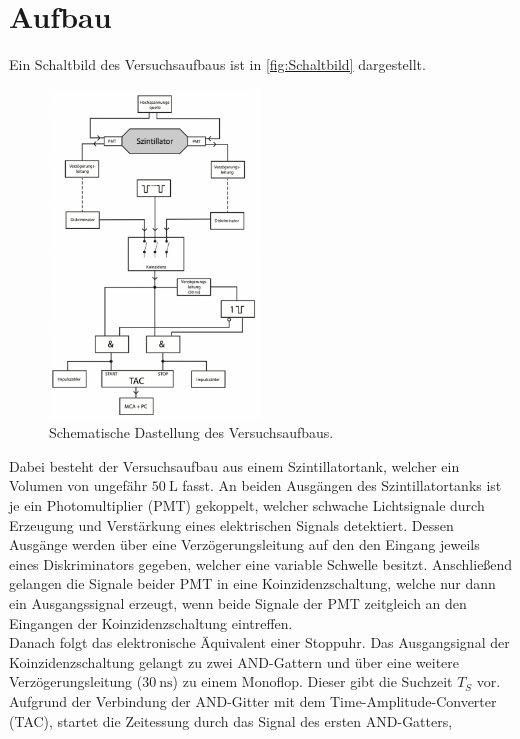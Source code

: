 \section{Aufbau}
\label{sec:Aufbau}
Ein Schaltbild des Versuchsaufbaus ist in \autoref{fig:Schaltbild} dargestellt. 
\begin{figure}[H]
    \centering
    \includegraphics[width=0.5\textwidth]{Abbildungen/Schaltung.png}
    \caption {Schematische Dastellung des Versuchsaufbaus.\cite{V01}}
    \label{fig:Schaltbild}
\end{figure}
Dabei besteht der Versuchsaufbau aus einem Szintillatortank, welcher ein Volumen von ungefähr $\qty{50}{\liter}$ fasst.
An beiden Ausgängen des Szintillatortanks ist je ein Photomultiplier (PMT) gekoppelt, welcher schwache Lichtsignale durch Erzeugung und Verstärkung eines elektrischen Signals detektiert.
Dessen Ausgänge werden über eine Verzögerungsleitung auf den den Eingang jeweils eines Diskriminators gegeben, welcher eine variable Schwelle besitzt. 
Anschließend gelangen die Signale beider PMT in eine Koinzidenzschaltung, welche nur dann ein Ausgangssignal erzeugt, wenn beide Signale der PMT zeitgleich an den Eingangen der Koinzidenzschaltung
eintreffen.\\
Danach folgt das elektronische Äquivalent einer Stoppuhr.
Das Ausgangsignal der Koinzidenzschaltung gelangt zu zwei AND-Gattern und über eine weitere Verzögerungsleitung ($\qty{30}{\nano\second}$) zu einem Monoflop. Dieser gibt die Suchzeit $T_S$ vor.
Aufgrund der Verbindung der AND-Gitter mit dem Time-Amplitude-Converter (TAC), startet die Zeitessung durch das Signal des ersten AND-Gatters,
